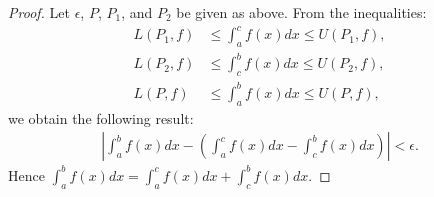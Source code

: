 \documentclass[10pt,twoside,openany]{memoir}
\begin{document}
\begin{proof}
            Let $\epsilon$, $P$, $P_1$, and $P_2$ be given as above. From the inequalities:
                \begin{equation*}
                \begin{split}
                    L(P_1,f) &\leq \int_a^c f(x)dx \leq U(P_1,f), \\
                    L(P_2,f) &\leq \int_c^b f(x)dx \leq U(P_2,f), \\
                    L(P,f) &\leq \int_a^b f(x)dx \leq U(P,f),
                \end{split}
                \end{equation*}
            we obtain the following result:
                \begin{equation*}
                \begin{split}
                    \left| \int_a^b f(x)dx - \left( \int_a^c f(x)dx - \int_c^b f(x)dx \right) \right| < \epsilon.
                \end{split}
                \end{equation*}
            Hence $\int_a^b f(x)dx = \int_a^c f(x)dx + \int_c^b f(x)dx$.
            
        \end{proof}
\end{document}
